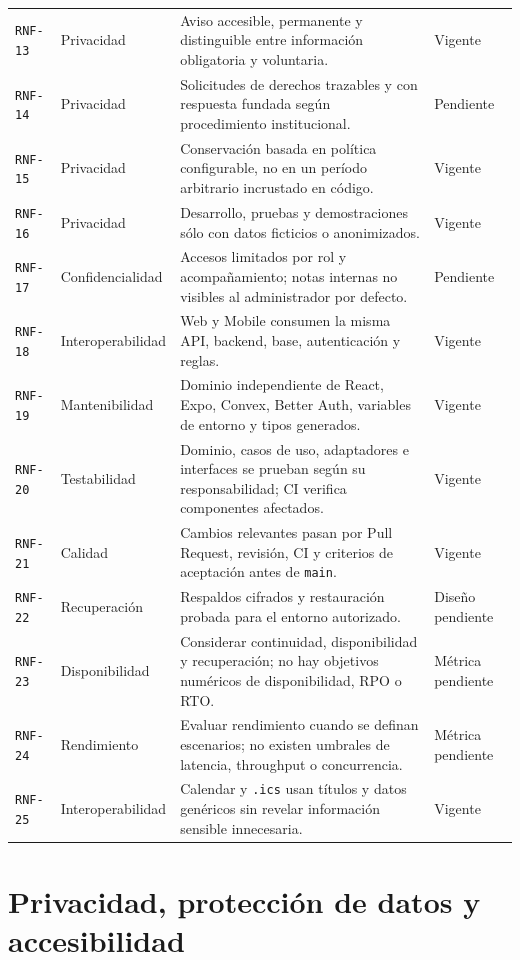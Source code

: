 \documentclass[10pt,a4paper,oneside]{article}
\newcommand{\id}[1]{\texttt{#1}}
\begin{document}
\begin{longtable}{@{}L{0.075\textwidth}L{0.16\textwidth}L{0.60\textwidth}L{0.10\textwidth}@{}}
\id{RNF-13} & Privacidad & Aviso accesible, permanente y distinguible entre información obligatoria y voluntaria. & Vigente\\
\id{RNF-14} & Privacidad & Solicitudes de derechos trazables y con respuesta fundada según procedimiento institucional. & Pendiente\\
\id{RNF-15} & Privacidad & Conservación basada en política configurable, no en un período arbitrario incrustado en código. & Vigente\\
\id{RNF-16} & Privacidad & Desarrollo, pruebas y demostraciones sólo con datos ficticios o anonimizados. & Vigente\\
\id{RNF-17} & Confidencialidad & Accesos limitados por rol y acompañamiento; notas internas no visibles al administrador por defecto. & Pendiente\\
\id{RNF-18} & Interoperabilidad & Web y Mobile consumen la misma API, backend, base, autenticación y reglas. & Vigente\\
\id{RNF-19} & Mantenibilidad & Dominio independiente de React, Expo, Convex, Better Auth, variables de entorno y tipos generados. & Vigente\\
\id{RNF-20} & Testabilidad & Dominio, casos de uso, adaptadores e interfaces se prueban según su responsabilidad; CI verifica componentes afectados. & Vigente\\
\id{RNF-21} & Calidad & Cambios relevantes pasan por Pull Request, revisión, CI y criterios de aceptación antes de \texttt{main}. & Vigente\\
\id{RNF-22} & Recuperación & Respaldos cifrados y restauración probada para el entorno autorizado. & Diseño pendiente\\
\id{RNF-23} & Disponibilidad & Considerar continuidad, disponibilidad y recuperación; no hay objetivos numéricos de disponibilidad, RPO o RTO. & Métrica pendiente\\
\id{RNF-24} & Rendimiento & Evaluar rendimiento cuando se definan escenarios; no existen umbrales de latencia, throughput o concurrencia. & Métrica pendiente\\
\id{RNF-25} & Interoperabilidad & Calendar y \texttt{.ics} usan títulos y datos genéricos sin revelar información sensible innecesaria. & Vigente\\
\end{longtable}
\normalsize
\section{Privacidad, protección de datos y accesibilidad}
\end{document}
